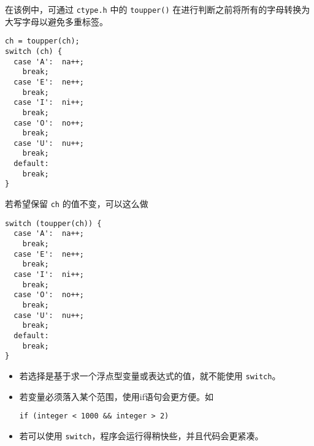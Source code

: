 \begin{frame}[fragile]\ft{\secname}
在该例中，可通过 \lstinline|ctype.h| 中的 \lstinline|toupper()| 在进行判断之前将所有的字母转换为大写字母以避免多重标签。
\end{frame}

\begin{frame}[fragile]\ft{\secname}
\begin{lstlisting}
ch = toupper(ch);
switch (ch) {
  case 'A':  na++;
    break;
  case 'E':  ne++;
    break;
  case 'I':  ni++;
    break;
  case 'O':  no++;
    break;
  case 'U':  nu++;
    break;
  default:
    break;
}   
\end{lstlisting}           
\end{frame}

\begin{frame}[fragile]\ft{\secname}
若希望保留 \lstinline|ch| 的值不变，可以这么做
\begin{lstlisting}
switch (toupper(ch)) {
  case 'A':  na++;
    break;
  case 'E':  ne++;
    break;
  case 'I':  ni++;
    break;
  case 'O':  no++;
    break;
  case 'U':  nu++;
    break;
  default:
    break;
}
\end{lstlisting}  
\end{frame}

\begin{frame}[fragile]
\begin{itemize}
\item
若选择是基于求一个浮点型变量或表达式的值，就不能使用 \lstinline|switch|。\\[0.1in]
\item
若变量必须落入某个范围，使用if语句会更方便。如
\begin{lstlisting}
if (integer < 1000 && integer > 2)  
\end{lstlisting}
\vspace{0.1in}
\item 若可以使用 \lstinline|switch|，程序会运行得稍快些，并且代码会更紧凑。 
\end{itemize}         
\end{frame}





